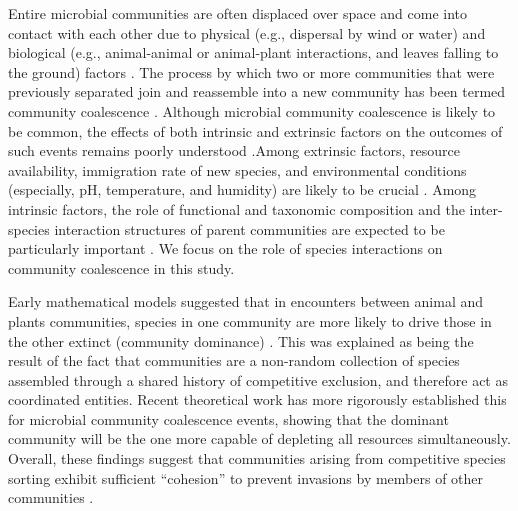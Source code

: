 \documentclass[10pt,letterpaper]{article}
\begin{document}
Entire microbial communities are often displaced over space and come into contact with each other due to physical (e.g., dispersal by wind or water) and biological (e.g., animal-animal or animal-plant interactions, and leaves falling to the ground) factors \cite{Kort2014, Evans2020,Luo2020, Vass2021}. The process by which two or more communities that were previously separated join and reassemble into a new community has been termed community coalescence \cite{Rillig2015}. Although microbial community coalescence is likely to be common, the effects of both intrinsic and extrinsic factors on the outcomes of such events remains poorly understood \cite{Rillig2016a}.Among extrinsic factors, resource availability, immigration rate of new species, and environmental conditions (especially, pH, temperature, and humidity) are likely to be crucial \cite{Rillig2016b, Sierocinski2017, Castledine2020}. Among intrinsic factors, the role of functional and taxonomic composition and the inter-species interaction structures of parent communities are expected to be particularly important \cite{Rillig2016b, Castledine2020}. We focus on the role of species interactions on community coalescence in this study.

Early mathematical models suggested that in encounters between animal and plants communities, species in one community are more likely to drive those in the other extinct (community dominance) \cite{Gilpin1994, Toquenaga1997}. This was explained as being the result of the fact that communities are a non-random collection of species assembled through a shared history of competitive exclusion, and therefore act as coordinated entities. Recent theoretical work \cite{Tikhonov2016} has more rigorously established this for microbial community coalescence events, showing that the dominant community will be the one more capable of depleting all resources simultaneously. Overall, these findings suggest that communities arising from competitive species sorting exhibit sufficient ``cohesion'' to prevent invasions by members of other communities \cite{Pascual-Garcia2020, Marsland2020}.
\end{document}
